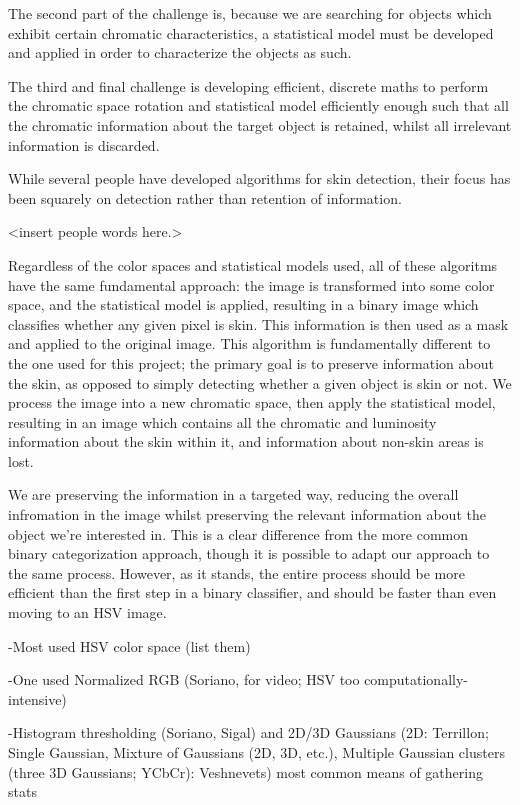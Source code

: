 The second part of the challenge is, because we are searching for objects which exhibit certain chromatic characteristics, a statistical model must be developed and applied in order to characterize the objects as such.

The third and final challenge is developing efficient, discrete maths to perform the chromatic space rotation and statistical model efficiently enough such that all the chromatic information about the target object is retained, whilst all irrelevant information is discarded.

While several people have developed algorithms for skin detection, their focus has been squarely on detection rather than retention of information.

<insert people words here.>

Regardless of the color spaces and statistical models used, all of these algoritms have the same fundamental approach: the image is transformed into some color space, and the statistical model is applied, resulting in a binary image which classifies whether any given pixel is skin. This information is then used as a mask and applied to the original image. This algorithm is fundamentally different to the one used for this project; the primary goal is to preserve information about the skin, as opposed to simply detecting whether a given object is skin or not. We process the image into a new chromatic space, then apply the statistical model, resulting in an image which contains all the chromatic and luminosity information about the skin within it, and information about non-skin areas is lost. 

We are preserving the information in a targeted way, reducing the overall infromation in the image whilst preserving the relevant information about the object we're interested in. This is a clear difference from the more common binary categorization approach, though it is possible to adapt our approach to the same process. However, as it stands, the entire process should be more efficient than the first step in a binary classifier, and should be faster than even moving to an HSV image.


-Most used HSV color space (list them)

-One used Normalized RGB (Soriano, for video; HSV too computationally-intensive)

-Histogram thresholding (Soriano, Sigal) and 2D/3D Gaussians (2D: Terrillon; Single Gaussian, Mixture of Gaussians (2D, 3D, etc.), Multiple Gaussian clusters (three 3D Gaussians; YCbCr): Veshnevets) most common means of gathering stats

